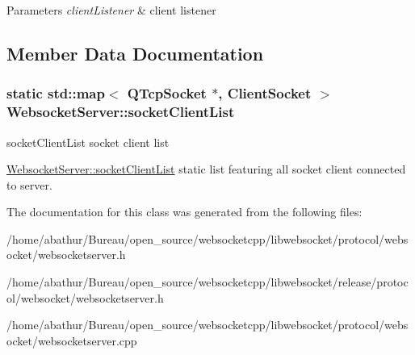 \begin{DoxyParams}{Parameters}
{\em client\-Listener} & client listener \\
\hline
\end{DoxyParams}


\subsection{Member Data Documentation}
\hypertarget{class_websocket_server_acfa614b7fed5046d8cf7ca65baabb275}{
\subsubsection[{socket\-Client\-List}]{\setlength{\rightskip}{0pt plus 5cm}static std\-::map$<$ Q\-Tcp\-Socket $\ast$, {\bf Client\-Socket} $>$ Websocket\-Server\-::socket\-Client\-List\hspace{0.3cm}{\ttfamily [static]}}}\label{class_websocket_server_acfa614b7fed5046d8cf7ca65baabb275}


socket\-Client\-List socket client list 

\hyperlink{class_websocket_server_acfa614b7fed5046d8cf7ca65baabb275}{Websocket\-Server\-::socket\-Client\-List} static list featuring all socket client connected to server. 

The documentation for this class was generated from the following files\-:\begin{DoxyCompactItemize}
\item 
/home/abathur/\-Bureau/open\-\_\-source/websocketcpp/libwebsocket/protocol/websocket/websocketserver.\-h\item 
/home/abathur/\-Bureau/open\-\_\-source/websocketcpp/libwebsocket/release/protocol/websocket/websocketserver.\-h\item 
/home/abathur/\-Bureau/open\-\_\-source/websocketcpp/libwebsocket/protocol/websocket/websocketserver.\-cpp\end{DoxyCompactItemize}
